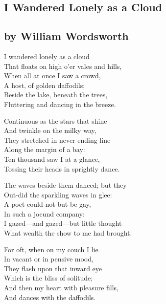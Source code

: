 \documentclass[14pt]{article}
\begin{document}
\begin{center}
\vspace*{1cm}
\begin{tcolorbox}[colframe=black, boxrule=1pt, width=0.8\textwidth, left=10pt, right=10pt, top=10pt, bottom=10pt]

\setlength{\parskip}{1.2ex}
\section*{I Wandered Lonely as a Cloud}

\subsection*{by William Wordsworth}

I wandered lonely as a cloud\\
That floats on high o'er vales and hills,\\
When all at once I saw a crowd,\\
A host, of golden daffodils;\\
Beside the lake, beneath the trees,\\
Fluttering and dancing in the breeze.

Continuous as the stars that shine\\
And twinkle on the milky way,\\
They stretched in never-ending line\\
Along the margin of a bay:\\
Ten thousand saw I at a glance,\\
Tossing their heads in sprightly dance.

The waves beside them danced; but they\\
Out-did the sparkling waves in glee:\\
A poet could not but be gay,\\
In such a jocund company:\\
I gazed---and gazed---but little thought\\
What wealth the show to me had brought:

For oft, when on my couch I lie\\
In vacant or in pensive mood,\\
They flash upon that inward eye\\
Which is the bliss of solitude;\\
And then my heart with pleasure fills,\\
And dances with the daffodils.
\end{tcolorbox}
\end{center}

\clearpage
\end{document}
